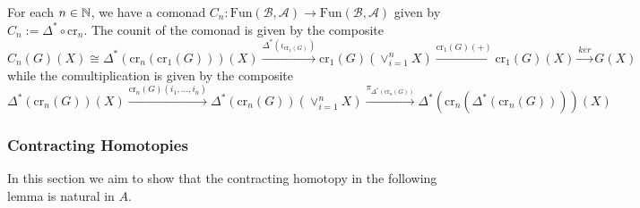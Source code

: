 \begin{defn}[label=defn:crossEffectComonad]
    For each $n \in \mathbb N$, we have a comonad $C_n:\text{Fun}(\mathcal{B},\mathcal{A})\rightarrow \text{Fun}(\mathcal{B},\mathcal{A})$ given by $C_n := \Delta^*\circ \text{cr}_n$. The counit of the comonad is given by the composite 
    \begin{equation*}
        C_n(G)(X) \cong \Delta^*(\text{cr}_n(\text{cr}_1(G)))(X)\xrightarrow{\Delta^*(\iota_{\text{cr}_1(G)})}\text{cr}_1(G)(\lor_{i=1}^nX)\xrightarrow{\text{cr}_1(G)(+)}\text{cr}_1(G)(X)\xrightarrow{ker}G(X)
    \end{equation*}
    while the comultiplication is given by the composite 
    \begin{equation*}
        \Delta^*(\text{cr}_n(G))(X)\xrightarrow{\text{cr}_n(G)(i_1,...,i_n)}\Delta^*(\text{cr}_n(G))(\lor_{i=1}^nX)\xrightarrow{\pi_{\Delta^*(\text{cr}_n(G))}}\Delta^*(\text{cr}_n(\Delta^*(\text{cr}_n(G))))(X)
    \end{equation*}
\end{defn}


\subsubsection{Contracting Homotopies}


In this section we aim to show that the contracting homotopy in the following lemma is natural in $A$.

